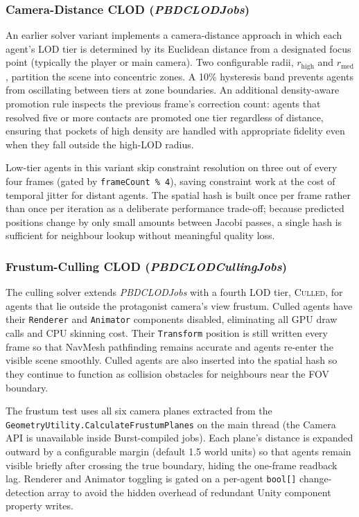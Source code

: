 \subsubsection{Camera-Distance CLOD (\textit{PBDCLODJobs})}
\label{sec:clod_camera}

An earlier solver variant implements a camera-distance approach in which each
agent's LOD tier is determined by its Euclidean distance from a designated
focus point (typically the player or main camera).  Two configurable radii,
$r_{\mathrm{high}}$ and $r_{\mathrm{med}}$, partition the scene into
concentric zones.  A 10\% hysteresis band prevents agents from oscillating
between tiers at zone boundaries.  An additional density-aware promotion rule
inspects the previous frame's correction count: agents that resolved five or
more contacts are promoted one tier regardless of distance, ensuring that
pockets of high density are handled with appropriate fidelity even when they
fall outside the high-LOD radius.

Low-tier agents in this variant skip constraint resolution on three out of
every four frames (gated by \texttt{frameCount \% 4}), saving constraint work
at the cost of temporal jitter for distant agents.  The spatial hash is
built once per frame rather than once per iteration as a deliberate
performance trade-off; because predicted positions change by only small amounts
between Jacobi passes, a single hash is sufficient for neighbour lookup without
meaningful quality loss.

\subsubsection{Frustum-Culling CLOD (\textit{PBDCLODCullingJobs})}
\label{sec:clod_culling}

The culling solver extends \textit{PBDCLODJobs} with a fourth LOD tier,
\textsc{Culled}, for agents that lie outside the protagonist camera's view
frustum.  Culled agents have their \texttt{Renderer} and \texttt{Animator}
components disabled, eliminating all GPU draw calls and CPU skinning cost.
Their \texttt{Transform} position is still written every frame so that NavMesh
pathfinding remains accurate and agents re-enter the visible scene smoothly.
Culled agents are also inserted into the spatial hash so they continue to
function as collision obstacles for neighbours near the FOV boundary.

The frustum test uses all six camera planes extracted from the
\texttt{GeometryUtility.\allowbreak CalculateFrustumPlanes}  on the main thread (the
Camera API is unavailable inside Burst-compiled jobs).  Each plane's
distance is
expanded outward by a configurable margin (default 1.5 world units) so that
agents remain visible briefly after crossing the true boundary, hiding the
one-frame readback lag.  Renderer and Animator toggling is gated on a
per-agent \texttt{bool[]} change-detection array to avoid the hidden overhead
of redundant Unity component property writes.

